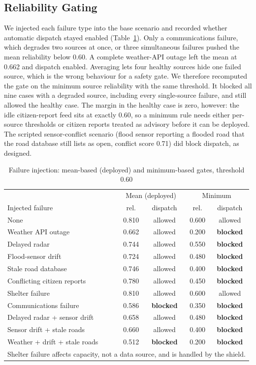 \documentclass[conference]{IEEEtran}
\begin{document}
\subsection{Reliability Gating}
\label{sec:gating}
We injected each failure type into the base scenario and recorded whether automatic dispatch stayed enabled (Table~\ref{tab:gate}). Only a communications failure, which degrades two sources at once, or three simultaneous failures pushed the mean reliability below 0.60. A complete weather-API outage left the mean at 0.662 and dispatch enabled. Averaging lets four healthy sources hide one failed source, which is the wrong behaviour for a safety gate. We therefore recomputed the gate on the minimum source reliability with the same threshold. It blocked all nine cases with a degraded source, including every single-source failure, and still allowed the healthy case. The margin in the healthy case is zero, however: the idle citizen-report feed sits at exactly 0.60, so a minimum rule needs either per-source thresholds or citizen reports treated as advisory before it can be deployed. The scripted sensor-conflict scenario (flood sensor reporting a flooded road that the road database still lists as open, conflict score 0.71) did block dispatch, as designed.

\begin{table}[t]
\caption{Failure injection: mean-based (deployed) and minimum-based gates, threshold 0.60}
\label{tab:gate}
\centering
\footnotesize
\setlength{\tabcolsep}{3pt}
\begin{tabular}{lcccc}
\toprule
 & \multicolumn{2}{c}{Mean (deployed)} & \multicolumn{2}{c}{Minimum}\\
Injected failure & rel. & dispatch & rel. & dispatch\\
\midrule
None & 0.810 & allowed & 0.600 & allowed\\
Weather API outage & 0.662 & allowed & 0.200 & \textbf{blocked}\\
Delayed radar & 0.744 & allowed & 0.550 & \textbf{blocked}\\
Flood-sensor drift & 0.724 & allowed & 0.480 & \textbf{blocked}\\
Stale road database & 0.746 & allowed & 0.400 & \textbf{blocked}\\
Conflicting citizen reports & 0.780 & allowed & 0.450 & \textbf{blocked}\\
Shelter failure & 0.810 & allowed & 0.600 & allowed\\
Communications failure & 0.586 & \textbf{blocked} & 0.350 & \textbf{blocked}\\
Delayed radar + sensor drift & 0.658 & allowed & 0.480 & \textbf{blocked}\\
Sensor drift + stale roads & 0.660 & allowed & 0.400 & \textbf{blocked}\\
Weather + drift + stale roads & 0.512 & \textbf{blocked} & 0.200 & \textbf{blocked}\\
\bottomrule
\multicolumn{5}{l}{\scriptsize Shelter failure affects capacity, not a data source, and is handled by the shield.}\\
\end{tabular}
\end{table}
\end{document}

